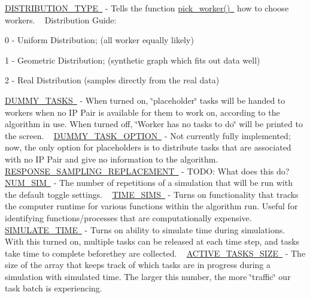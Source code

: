  \mbox{\hyperlink{}{D\+I\+S\+T\+R\+I\+B\+U\+T\+I\+O\+N\+\_\+\+T\+Y\+PE }} -\/ Tells the function \mbox{\hyperlink{}{pick\+\_\+worker() }} how to choose workers. ~\newline
Distribution Guide\+:
\begin{DoxyItemize}
\item 0 -\/ Uniform Distribution; (all worker equally likely)
\item 1 -\/ Geometric Distribution; (synthetic graph which fits out data well)
\item 2 -\/ Real Distribution (samples directly from the real data)
\end{DoxyItemize}

\mbox{\hyperlink{}{D\+U\+M\+M\+Y\+\_\+\+T\+A\+S\+KS }} -\/ When turned on, \char`\"{}placeholder\char`\"{} tasks will be handed to workers when no IP Pair is available for them to work on, according to the algorithm in use. When turned off, \char`\"{}\+Worker has no tasks to do\char`\"{} will be printed to the screen. ~\newline
 \mbox{\hyperlink{}{D\+U\+M\+M\+Y\+\_\+\+T\+A\+S\+K\+\_\+\+O\+P\+T\+I\+ON }} -\/ Not currently fully implemented; now, the only option for placeholders is to distribute tasks that are associated with no IP Pair and give no information to the algorithm. ~\newline
 \mbox{\hyperlink{}{R\+E\+S\+P\+O\+N\+S\+E\+\_\+\+S\+A\+M\+P\+L\+I\+N\+G\+\_\+\+R\+E\+P\+L\+A\+C\+E\+M\+E\+NT }} -\/ T\+O\+DO\+: What does this do? ~\newline
 \mbox{\hyperlink{}{N\+U\+M\+\_\+\+S\+IM }} -\/ The number of repetitions of a simulation that will be run with the default toggle settings. ~\newline
 \mbox{\hyperlink{}{T\+I\+M\+E\+\_\+\+S\+I\+MS }} -\/ Turns on functionality that tracks the computer runtime for various functions within the algorithm run. Useful for identifying functions/processes that are computationally expensive. ~\newline
 \mbox{\hyperlink{}{S\+I\+M\+U\+L\+A\+T\+E\+\_\+\+T\+I\+ME }} -\/ Turns on ability to simulate time during simulations. With this turned on, multiple tasks can be released at each time step, and tasks take time to complete beforethey are collected. ~\newline
 \mbox{\hyperlink{}{A\+C\+T\+I\+V\+E\+\_\+\+T\+A\+S\+K\+S\+\_\+\+S\+I\+ZE }} -\/ The size of the array that keeps track of which tasks are in progress during a simulation with simulated time. The larger this number, the more \char`\"{}traffic\char`\"{} our task batch is experiencing. ~\newline
